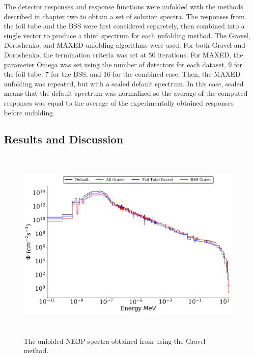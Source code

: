 The detector responses and response functions were unfolded with the methods described in chapter two to obtain a set of solution spectra.
The responses from the foil tube and the BSS were first considered separetely, then combined into a single vector to produce a third spectrum for each unfolding method.
The Gravel, Doroshenko, and MAXED unfolding algorithms were used.
For both Gravel and Doroshenko, the termination criteria was set at 50 iterations.
For MAXED, the parameter Omega was set using the number of detectors for each dataset, 9 for the foil tube, 7 for the BSS, and 16 for the combined case.
Then, the MAXED unfolding was repeated, but with a scaled default spectrum.
In this case, scaled means that the default spectrum was normalized so the average of the computed responses was equal to the average of the experimentally obtained responses before unfolding.

\subsection{Results and Discussion}


\begin{figure}[htb]
\includegraphics[height=3.8in]{tex/figures/unfolded_gr.pdf}
\caption[Gravel Unfolded Spectra]{The unfolded NEBP spectra obtained from using the Gravel method.}
\label{fig:unfolded_gr}
\end{figure}

